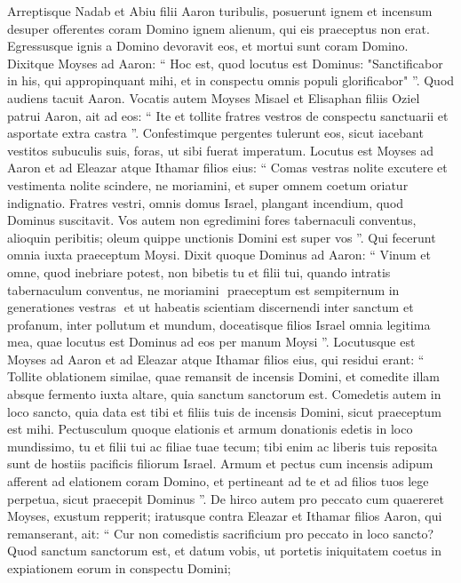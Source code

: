 \begin{biblechapter}
\begin{biblechapter}
\begin{biblechapter}
\begin{biblechapter}
\begin{biblechapter}
\begin{biblechapter}
\begin{biblechapter}
\begin{biblechapter}
\begin{biblechapter}
\begin{biblechapter}
\verse Arreptisque Nadab et Abiu filii Aaron turibulis, posuerunt ignem et incensum desuper offerentes coram Domino ignem alienum, qui eis praeceptus non erat. 
\verse Egressusque ignis a Domino devoravit eos, et mortui sunt coram Domino.
 \verse Dixitque Moyses ad Aaron: “ Hoc est, quod locutus est Dominus: "Sanctificabor in his, qui appropinquant mihi, et in conspectu omnis populi glorificabor" ”. Quod audiens tacuit Aaron. 
\verse Vocatis autem Moyses Misael et Elisaphan filiis Oziel patrui Aaron, ait ad eos: “ Ite et tollite fratres vestros de conspectu sanctuarii et asportate extra castra ”. 
\verse Confestimque pergentes tulerunt eos, sicut iacebant vestitos subuculis suis, foras, ut sibi fuerat imperatum.
 \verse Locutus est Moyses ad Aaron et ad Eleazar atque Ithamar filios eius: “ Comas vestras nolite excutere et vestimenta nolite scindere, ne moriamini, et super omnem coetum oriatur indignatio. Fratres vestri, omnis domus Israel, plangant incendium, quod Dominus suscitavit. 
\verse Vos autem non egredimini fores tabernaculi conventus, alioquin peribitis; oleum quippe unctionis Domini est super vos ”. Qui fecerunt omnia iuxta praeceptum Moysi.
 \verse Dixit quoque Dominus ad Aaron: 
\verse “ Vinum et omne, quod inebriare potest, non bibetis tu et filii tui, quando intratis tabernaculum conventus, ne moriamini ­ praeceptum est sempiternum in generationes vestras ­
\verse et ut habeatis scientiam discernendi inter sanctum et profanum, inter pollutum et mundum, 
\verse doceatisque filios Israel omnia legitima mea, quae locutus est Dominus ad eos per manum Moysi ”.
 \verse Locutusque est Moyses ad Aaron et ad Eleazar atque Ithamar filios eius, qui residui erant: “ Tollite oblationem similae, quae remansit de incensis Domini, et comedite illam absque fermento iuxta altare, quia sanctum sanctorum est. 
 \verse Comedetis autem in loco sancto, quia data est tibi et filiis tuis de incensis Domini, sicut praeceptum est mihi. 
\verse Pectusculum quoque elationis et armum donationis edetis in loco mundissimo, tu et filii tui ac filiae tuae tecum; tibi enim ac liberis tuis reposita sunt de hostiis pacificis filiorum Israel. 
\verse Armum et pectus cum incensis adipum afferent ad elationem coram Domino, et pertineant ad te et ad filios tuos lege perpetua, sicut praecepit Dominus ”.
 \verse De hirco autem pro peccato cum quaereret Moyses, exustum repperit; iratusque contra Eleazar et Ithamar filios Aaron, qui remanserant, ait: 
\verse “ Cur non comedistis sacrificium pro peccato in loco sancto? Quod sanctum sanctorum est, et datum vobis, ut portetis iniquitatem coetus in expiationem eorum in conspectu Domini; 

\end{biblechapter}
\end{biblechapter}
\end{biblechapter}
\end{biblechapter}
\end{biblechapter}
\end{biblechapter}
\end{biblechapter}
\end{biblechapter}
\end{biblechapter}
\end{biblechapter}
